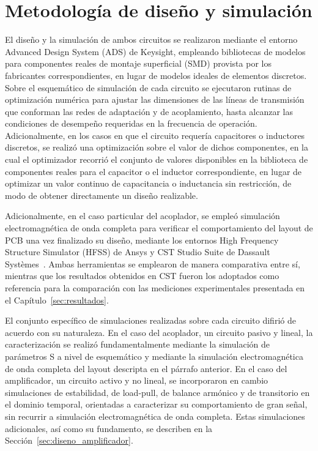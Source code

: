 \section{Metodología de diseño y simulación} \label{sec:metodologia_diseno_sim}
El diseño y la simulación de ambos circuitos se realizaron mediante el entorno Advanced Design System (ADS) de Keysight, empleando bibliotecas de modelos para componentes reales de montaje superficial (SMD) provista por los fabricantes correspondientes, en lugar de modelos ideales de elementos discretos. Sobre el esquemático de simulación de cada circuito se ejecutaron rutinas de optimización numérica para ajustar las dimensiones de las líneas de transmisión que conforman las redes de adaptación y de acoplamiento, hasta alcanzar las condiciones de desempeño requeridas en la frecuencia de operación. Adicionalmente, en los casos en que el circuito requería capacitores o inductores discretos, se realizó una optimización sobre el valor de dichos componentes, en la cual el optimizador recorrió el conjunto de valores disponibles en la biblioteca de componentes reales para el capacitor o el inductor correspondiente, en lugar de optimizar un valor continuo de capacitancia o inductancia sin restricción, de modo de obtener directamente un diseño realizable.

Adicionalmente, en el caso particular del acoplador, se empleó simulación electromagnética de onda completa para verificar el comportamiento del layout de PCB una vez finalizado su diseño, mediante los entornos High Frequency Structure Simulator (HFSS) de Ansys y CST Studio Suite de Dassault Systèmes~\cite{cst}. Ambas herramientas se emplearon de manera comparativa entre sí, mientras que los resultados obtenidos en CST fueron los adoptados como referencia para la comparación con las mediciones experimentales presentada en el Capítulo~\ref{sec:resultados}.

El conjunto específico de simulaciones realizadas sobre cada circuito difirió de acuerdo con su naturaleza. En el caso del acoplador, un circuito pasivo y lineal, la caracterización se realizó fundamentalmente mediante la simulación de parámetros S a nivel de esquemático y mediante la simulación electromagnética de onda completa del layout descripta en el párrafo anterior. En el caso del amplificador, un circuito activo y no lineal, se incorporaron en cambio simulaciones de estabilidad, de load-pull, de balance armónico y de transitorio en el dominio temporal, orientadas a caracterizar su comportamiento de gran señal, sin recurrir a simulación electromagnética de onda completa. Estas simulaciones adicionales, así como su fundamento, se describen en la Sección~\ref{sec:diseno_amplificador}.


